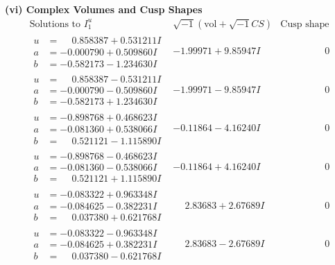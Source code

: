 \documentclass[1p]{elsarticle_modified}
\theoremstyle{definition}
\newcommand{\I}{\sqrt{-1}}
\begin{document}
\newpage\flushleft \textbf{(vi) Complex Volumes and Cusp Shapes}
$$\begin{array}{c|c|c}  
\text{Solutions to }I^u_{1}& \I (\text{vol} + \sqrt{-1}CS) & \text{Cusp shape}\\
 \hline 
\begin{aligned}
u &= \phantom{-}0.858387 + 0.531211 I \\
a &= -0.000790 + 0.509860 I \\
b &= -0.582173 - 1.234630 I\end{aligned}
 & -1.99971 + 9.85947 I & \phantom{-0.000000 } 0 \\ \hline\begin{aligned}
u &= \phantom{-}0.858387 - 0.531211 I \\
a &= -0.000790 - 0.509860 I \\
b &= -0.582173 + 1.234630 I\end{aligned}
 & -1.99971 - 9.85947 I & \phantom{-0.000000 } 0 \\ \hline\begin{aligned}
u &= -0.898768 + 0.468623 I \\
a &= -0.081360 + 0.538066 I \\
b &= \phantom{-}0.521121 - 1.115890 I\end{aligned}
 & -0.11864 - 4.16240 I & \phantom{-0.000000 } 0 \\ \hline\begin{aligned}
u &= -0.898768 - 0.468623 I \\
a &= -0.081360 - 0.538066 I \\
b &= \phantom{-}0.521121 + 1.115890 I\end{aligned}
 & -0.11864 + 4.16240 I & \phantom{-0.000000 } 0 \\ \hline\begin{aligned}
u &= -0.083322 + 0.963348 I \\
a &= -0.084625 - 0.382231 I \\
b &= \phantom{-}0.037380 + 0.621768 I\end{aligned}
 & \phantom{-}2.83683 + 2.67689 I & \phantom{-0.000000 } 0 \\ \hline\begin{aligned}
u &= -0.083322 - 0.963348 I \\
a &= -0.084625 + 0.382231 I \\
b &= \phantom{-}0.037380 - 0.621768 I\end{aligned}
 & \phantom{-}2.83683 - 2.67689 I & \phantom{-0.000000 } 0 \\ \hline\begin{aligned}

\end{aligned}
\end{array}$$
\end{document}
